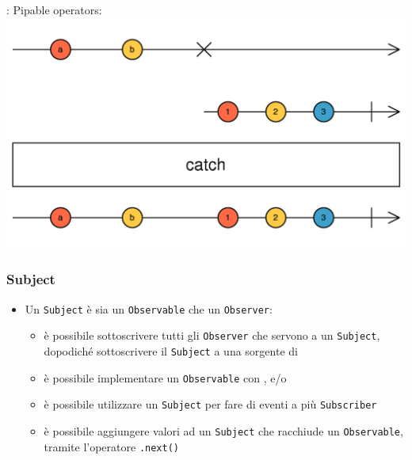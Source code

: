             \begin{frame}[c, fragile]{\insertsubsectionhead}{: Pipable operators: \texttt{\insertsubsubsectionhead}}
                \includegraphics[width=\linewidth]{catch}
            \end{frame}

            \subsubsection{Subject}\label{subsub:subject}

            \begin{frame}{\insertsubsectionhead}
                \begin{block}{\texttt{\insertsubsubsectionhead}}
                    \begin{itemize}
                        \item Un \texttt{Subject} è sia un \texttt{Observable} che un \texttt{Observer}:
                              \begin{itemize}
                                  \item
                                      è possibile sottoscrivere tutti gli \texttt{Observer} che servono a un \texttt{Subject}, dopodiché sottoscrivere il \texttt{Subject} a una sorgente di 
                                  \item
                                      è possibile implementare un \texttt{Observable} con ,  e/o 
                                  \item
                                      è possibile utilizzare un \texttt{Subject} per fare  di eventi a più \texttt{Subscriber}
                                  \item
                                      è possibile aggiungere valori ad un \texttt{Subject} che racchiude un \texttt{Observable}, tramite l'operatore \texttt{.next()}
                              \end{itemize}
                    \end{itemize}
                \end{block}
            \end{frame}

